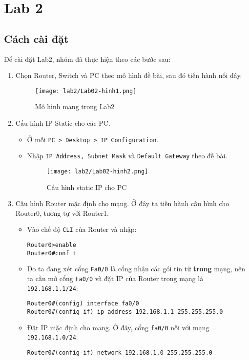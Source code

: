 \documentclass[]{article}
\begin{document}
\section{Lab 2}
\subsection{Cách cài đặt}
Để cài đặt Lab2, nhóm đã thực hiện theo các bước sau:
\begin{enumerate}
\item Chọn Router, Switch và PC theo mô hình đề bài, sau đó tiến hành nối dây.
\begin{figure}[H]
    \centering
    \texttt{[image: lab2/Lab02-hinh1.png]}
    \caption{Mô hình mạng trong Lab2}
    \label{fig:MohinhLab2}
\end{figure}
\item Cấu hình IP Static cho các PC.
\begin{itemize}
    \item Ở mỗi \texttt{PC > Desktop > IP Configuration}.
    \item Nhập \texttt{IP Address, Subnet Mask} và \texttt{Default Gateway} theo đề bài.
    \begin{figure}[H]
        \centering
        \texttt{[image: lab2/Lab02-hinh2.png]}
        \caption{Cấu hình static IP cho PC}
    \end{figure}
\end{itemize}
\item Cấu hình Router mặc định cho mạng.
Ở đây ta tiến hành cấu hình cho Router0, tương tự với Router1.\label{chRouter}
\begin{itemize}
\item Vào chế độ \texttt{CLI} của Router và nhập:
\begin{lstlisting}
Router0>enable
Router0#conf t
\end{lstlisting}
\item Do ta đang xét cổng \texttt{Fa0/0} là cổng nhận các gói tin từ \textbf{trong} mạng, nên ta cần mở cổng \texttt{Fa0/0} và đặt IP của Router trong mạng là \texttt{192.168.1.1/24}:
\begin{lstlisting}
Router0#(config) interface fa0/0
Router0#(config-if) ip-address 192.168.1.1 255.255.255.0
\end{lstlisting}
\item Đặt IP mặc định cho mạng. Ở đây, cổng \texttt{fa0/0} nối với mạng \texttt{192.168.1.0/24}:
\begin{lstlisting}
Router0#(config-if) network 192.168.1.0 255.255.255.0

\end{lstlisting}
\end{itemize}
\end{enumerate}
\end{document}
